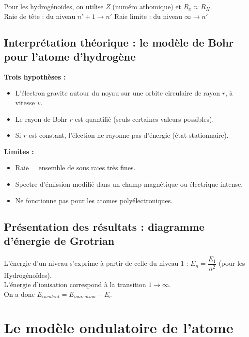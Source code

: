\documentclass[13pt, twoside, a4paper, french, tikz]{report}
\begin{document}
      \vspace*{10pt}
      Pour les hydrogénoïdes, on utilise $Z$ (numéro athomique) et $R_x \approx R_H$.\\
      
      Raie de tête : du niveau $n'+1 \rightarrow n'$ \;\;\; Raie limite : du niveau $\infty\rightarrow n'$
  
  
  \section{Interprétation théorique : le modèle de Bohr pour l'atome d'hydrogène}\label{sec:interpretation-theorique--le-modele-de-bohr-pour-latome-dhydrogene}
    
    \textbf{Trois hypothèses :}
    \begin{itemize}
      \item L'électron gravite autour du noyau sur une orbite circulaire de rayon $r$, à vitesse $v$.
      \item Le rayon de Bohr $r$ est quantifié (seuls certaines valeurs possibles).
      \item Si $r$ est constant, l'élection ne rayonne pas d'énergie (état stationnaire).
    \end{itemize}
    \textbf{Limites :}
    \begin{itemize}
      \item Raie = ensemble de sous raies très fines.
      \item Spectre d'émission modifié dans un champ magnétique ou électrique intense.
      \item Ne fonctionne pas pour les atomes polyélectroniques.
    \end{itemize}
  
  
  \section{Présentation des résultats : diagramme d'énergie de Grotrian}\label{sec:presentation-des-resultats--diagramme-denergie-de-grotrian}
    
    L'énergie d'un niveau s'exprime à partir de celle du niveau 1 : $E_n = \dfrac{E_1}{n^2}$ (pour les Hydrogénoïdes).\\
    L'énergie d'ionisation correspond à la transition $1 \rightarrow \infty$.\\
    On a donc $E_{incident} = E_{ionisation} + E_c$


\chapter{Le modèle ondulatoire de l'atome}\label{ch:le-modele-ondulatoire-de-l'atome}
  
\end{document}
